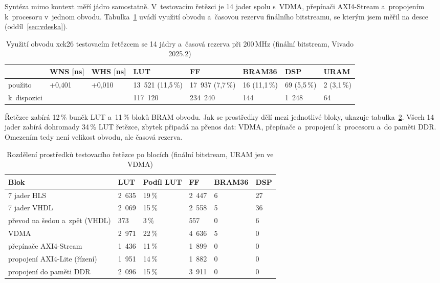 Syntéza mimo kontext měří jádro samostatně. V~testovacím řetězci je 14 jader spolu s~VDMA, přepínači AXI4-Stream a~propojením k~procesoru v~jednom obvodu. Tabulka~\ref{tab:retezec} uvádí využití obvodu a~časovou rezervu finálního bitstreamu, se kterým jsem měřil na desce (oddíl~\ref{sec:vdeska}).


\begin{table}[htbp]
    \centering
    \caption{Využití obvodu xck26 testovacím řetězcem se 14 jádry a~časová rezerva při 200\,MHz (finální bitstream, Vivado 2025.2)}
    \label{tab:retezec}
    \begin{tabular}{p{2.2cm}p{1.6cm}p{1.6cm}p{2.3cm}p{2.3cm}p{2.0cm}p{1.9cm}p{1.6cm}}
        \toprule
         & WNS [ns] & WHS [ns] & LUT & FF & BRAM36 & DSP & URAM \\
        \midrule
        použito & +0,401 & +0,010 & 13 521 (11,5\,\%) & 17 937 (7,7\,\%) & 16 (11,1\,\%) & 69 (5,5\,\%) & 2 (3,1\,\%) \\
        k~dispozici &  &  & 117 120 & 234 240 & 144 & 1 248 & 64 \\
        \bottomrule
    \end{tabular}
\end{table}


Řetězec zabírá 12\,\% buněk LUT a~11\,\% bloků BRAM obvodu. Jak se prostředky dělí mezi jednotlivé bloky, ukazuje tabulka~\ref{tab:retezecbloky}. Všech 14 jader zabírá dohromady 34\,\% LUT řetězce, zbytek připadá na přenos dat: VDMA, přepínače a~propojení k~procesoru a~do paměti DDR. Omezením tedy není velikost obvodu, ale časová rezerva.


\begin{table}[htbp]
    \centering
    \caption{Rozdělení prostředků testovacího řetězce po blocích (finální bitstream, URAM jen ve VDMA)}
    \label{tab:retezecbloky}
    \begin{tabular}{p{4.6cm}p{1.6cm}p{1.6cm}p{1.6cm}p{1.6cm}p{1.6cm}}
        \toprule
        Blok & LUT & Podíl LUT & FF & BRAM36 & DSP \\
        \midrule
        7 jader HLS & 2 635 & 19\,\% & 2 447 & 6 & 27 \\
        7 jader VHDL & 2 069 & 15\,\% & 2 558 & 5 & 36 \\
        převod na šedou a~zpět (VHDL) & 373 & 3\,\% & 557 & 0 & 6 \\
        VDMA & 2 971 & 22\,\% & 4 636 & 5 & 0 \\
        přepínače AXI4-Stream & 1 436 & 11\,\% & 1 899 & 0 & 0 \\
        propojení AXI4-Lite (řízení) & 1 951 & 14\,\% & 1 882 & 0 & 0 \\
        propojení do paměti DDR & 2 096 & 15\,\% & 3 911 & 0 & 0 \\
        \bottomrule
    \end{tabular}
\end{table}

